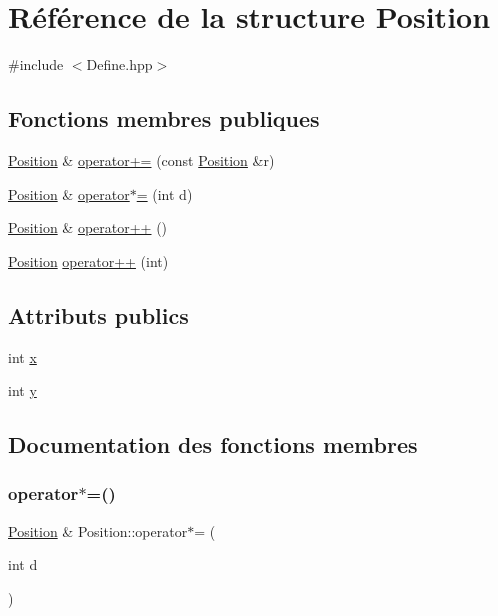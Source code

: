 \hypertarget{structPosition}{}\section{Référence de la structure Position}
\label{structPosition}


{\ttfamily \#include $<$Define.\+hpp$>$}

\subsection*{Fonctions membres publiques}
\begin{DoxyCompactItemize}
\item 
\hyperlink{structPosition}{Position} \& \hyperlink{structPosition_ade2e129796afdf1df8769392c2c9aa59}{operator+=} (const \hyperlink{structPosition}{Position} \&r)
\item 
\hyperlink{structPosition}{Position} \& \hyperlink{structPosition_ab665c20a3659543b51ebb671eda086b1}{operator$\ast$=} (int d)
\item 
\hyperlink{structPosition}{Position} \& \hyperlink{structPosition_ae020c1f70717b7e5c4a2202bed3ea0e2}{operator++} ()
\item 
\hyperlink{structPosition}{Position} \hyperlink{structPosition_a512547e3eeacaa34f1b9207d6054d998}{operator++} (int)
\end{DoxyCompactItemize}
\subsection*{Attributs publics}
\begin{DoxyCompactItemize}
\item 
int \hyperlink{structPosition_aeda152ffeee17ae5be9c02327b2408d8}{x}
\item 
int \hyperlink{structPosition_a3c08e9213d4726b21caba3073192c4a3}{y}
\end{DoxyCompactItemize}


\subsection{Documentation des fonctions membres}
\mbox{\label{structPosition_ab665c20a3659543b51ebb671eda086b1}} 
\subsubsection{\texorpdfstring{operator$\ast$=()}{operator*=()}}
{\footnotesize\ttfamily \hyperlink{structPosition}{Position} \& Position\+::operator$\ast$= (\begin{DoxyParamCaption}\item[{int}]{d }\end{DoxyParamCaption})}

